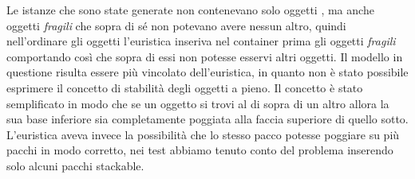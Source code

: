 Le istanze che sono state generate non contenevano solo oggetti , ma anche oggetti \textit{fragili} che sopra di sé non potevano avere nessun altro, quindi nell'ordinare gli oggetti l'euristica inseriva nel container prima gli oggetti \textit{fragili} comportando così che sopra di essi non potesse esservi altri oggetti. Il modello in questione risulta essere più vincolato dell'euristica, in quanto non è stato possibile esprimere il concetto di stabilità degli oggetti a pieno. Il concetto è stato semplificato in modo che se un oggetto si trovi al di sopra di un altro allora la sua base inferiore sia completamente poggiata alla faccia superiore di quello sotto. L'euristica aveva invece la possibilità che lo stesso pacco potesse poggiare su più pacchi in modo corretto, nei test abbiamo tenuto conto del problema inserendo solo alcuni pacchi stackable.